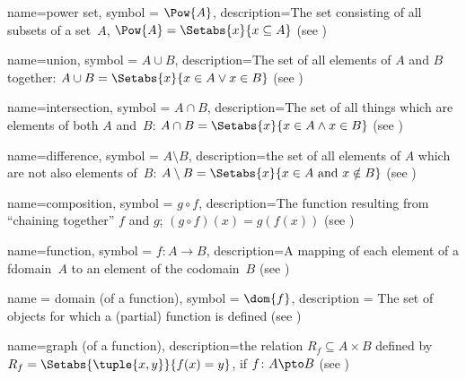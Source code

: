  {
  name=power set,
  symbol = {\ensuremath{\Pow{A}}},  
  description={The set consisting of all \glspl{subset} of a set~$A$,
    $\Pow{A} = \Setabs{x}{x \subseteq A}$ (see
    )} }

 {
  name=union,
  symbol = {\ensuremath{A \cup B}},
  description={The set of all {element}s of $A$ and $B$ together: $A
    \cup B = \Setabs{x}{x \in A \lor x\in B}$ (see
    )} }

 {
  name=intersection,
  symbol = {\ensuremath{A \cap B}},
  description={The set of all things which are {element}s of both
    $A$ and~$B$: $A \cap B = \Setabs{x}{x \in A \land x\in B}$ (see
    )} }

 {
  name=difference,
  symbol = {\ensuremath{A \setminus B}},
  description={the set of all {elements} of $A$ which are not also
  {element}s of~$B$: $A \setminus B = \Setabs{x}{x \in A \text{ and }
    x \notin B}$ (see )} }


 {
  name=composition,
  symbol = {\ensuremath{g \circ f}},  
  description={The function resulting from ``chaining together'' $f$
    and $g$; $(g \circ f)(x) = g(f(x))$ (see
    )} }

 {
  name=function,
  symbol = {\ensuremath{f \colon A \to B}},
  description={A mapping of each element of a \gls{fdomain}~$A$ to an
    element of the codomain~$B$ (see )} }

 {
  name = {domain (of a function)},
  symbol = {\ensuremath{\dom{f}}},
  description = {The set of objects for which a (partial) function is
    defined (see )}}


 {
  name=graph (of a function),
  description={the relation $R_f \subseteq A \times B$ defined by $R_f
    = \Setabs{\tuple{x,y}}{f(x) = y}$, if $f\colon A \pto B$ (see
    )} }

